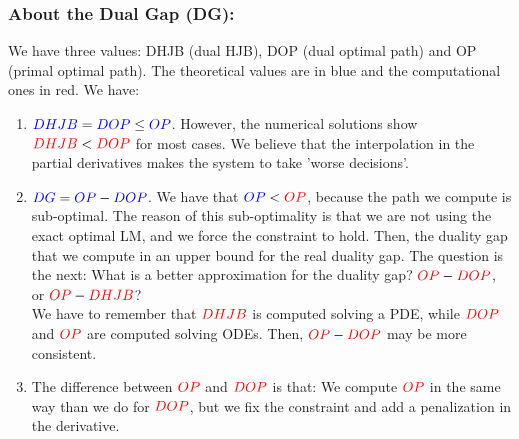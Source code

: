 \documentclass[aspectratio=169]{beamer}\usepackage[utf8]{inputenc}
\begin{document}
\begin{frame}\frametitle{About the Dual Gap (DG):}

We have three values: DHJB (dual HJB), DOP (dual optimal path) and OP (primal optimal path). The {\color{blue}theoretical values are in blue} and the {\color{red}computational ones in red}. We have:
\begin{enumerate}

\item ${\color{blue}DHJB} = {\color{blue}DOP}\leq{\color{blue}OP}$. However, the numerical solutions show ${\color{red}DHJB}<{\color{red}DOP}$ for most cases. We believe that the interpolation in the partial derivatives makes the system to take 'worse decisions'.

\item ${\color{blue}DG}={\color{blue}OP}-{\color{blue}DOP}$. We have that ${\color{blue}OP}<{\color{red}OP}$, because the path we compute is sub-optimal. The reason of this sub-optimality is that we are not using the exact optimal LM, and we force the constraint to hold. Then, the duality gap that we compute in an upper bound for the real duality gap. The question is the next: What is a better approximation for the duality gap? ${\color{red}OP}-{\color{red}DOP}$, or ${\color{red}OP}-{\color{red}DHJB}$?\\
We have to remember that ${\color{red}DHJB}$ is computed solving a PDE, while ${\color{red}DOP}$ and ${\color{red}OP}$ are computed solving ODEs. Then, ${\color{red}OP}-{\color{red}DOP}$ may be more consistent.

\item The difference between ${\color{red}OP}$ and ${\color{red}DOP}$ is that: We compute ${\color{red}OP}$ in the same way than we do for ${\color{red}DOP}$, but we fix the constraint and add a penalization in the derivative.

\end{enumerate}

\end{frame}
\end{document}
